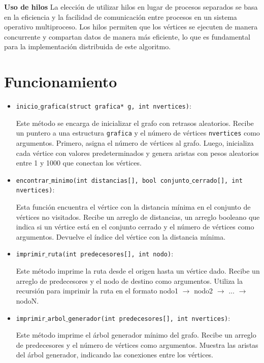 \documentclass[a4paper,12pt]{article}
\begin{document}
\textbf{Uso de hilos} La elección de utilizar hilos en lugar de procesos separados se basa en la eficiencia y la facilidad de comunicación entre procesos en un sistema operativo multiproceso. Los hilos permiten que los vértices se ejecuten de manera concurrente y compartan datos de manera más eficiente, lo que es fundamental para la implementación distribuida de este algoritmo. \\


\section*{Funcionamiento}

\begin{itemize}
    \item \texttt{inicio$\_$grafica(struct grafica* g, int nvertices)}:
    
    Este método se encarga de inicializar el grafo con retrasos aleatorios. Recibe un puntero a una estructura \texttt{grafica} y el número de vértices \texttt{nvertices} como argumentos. Primero, asigna el número de vértices al grafo. Luego, inicializa cada vértice con valores predeterminados y genera aristas con pesos aleatorios entre 1 y 1000 que conectan los vértices.

    \item \texttt{encontrar$\_$minimo(int distancias[], bool conjunto$\_$cerrado[], int nvertices)}: 
    
    Esta función encuentra el vértice con la distancia mínima en el conjunto de vértices no visitados. Recibe un arreglo de distancias, un arreglo booleano que indica si un vértice está en el conjunto cerrado y el número de vértices como argumentos. Devuelve el índice del vértice con la distancia mínima.

    \item \texttt{imprimir$\_$ruta(int predecesores[], int nodo)}:
    
    Este método imprime la ruta desde el origen hasta un vértice dado. Recibe un arreglo de predecesores y el nodo de destino como argumentos. Utiliza la recursión para imprimir la ruta en el formato nodo1 $\rightarrow$ nodo2 $\rightarrow$ ... $\rightarrow$ nodoN.

    \item \texttt{imprimir$\_$arbol$\_$generador(int predecesores[], int nvertices)}: 
    
    Este método imprime el árbol generador mínimo del grafo. Recibe un arreglo de predecesores y el número de vértices como argumentos. Muestra las aristas del árbol generador, indicando las conexiones entre los vértices.


\end{itemize}
\end{document}
